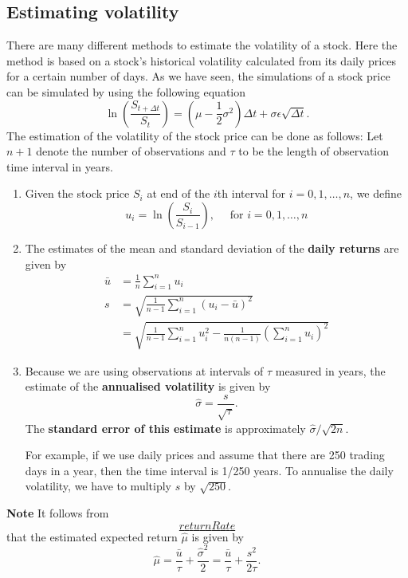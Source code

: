 \documentclass[
]{book}
\theoremstyle{definition}
\theoremstyle{definition}
\theoremstyle{definition}
\theoremstyle{definition}
\theoremstyle{remark}
\begin{document}
\hypertarget{estimating-volatility}{%
\subsection{Estimating volatility}\label{estimating-volatility}}

There are many different methods to estimate the volatility of a stock.
Here the method is based on a stock's historical volatility calculated
from its daily prices for a certain number of days. As we have seen, the
simulations of a stock price can be simulated by using the following
equation
\[\ln\left(  \frac{S_{t+\Delta t}}{S_t} \right) = (\mu - \frac{1}{2}\sigma^2 )\Delta t + \sigma \epsilon \sqrt{\Delta t}.\]
The estimation of the volatility of the stock price can be done as
follows: Let \(n+1\) denote the number of observations and \(\tau\) to be
the length of observation time interval in years.

\begin{enumerate}
\def\labelenumi{\arabic{enumi}.}
\item
  Given the stock price \(S_i\) at end of the \(i\)th interval for
  \(i = 0,1, \ldots, n\), we define
  \[u_i = \ln \left(\frac{S_i}{S_{i-1}} \right), \quad \text{ for } i = 0,1, \ldots, n\]
\item
  The estimates of the mean and standard deviation of the \textbf{daily
  returns} are given by \[\begin{aligned}
      \bar{u} &= \frac{1}{n} \sum_{i=1}^n u_i \\
      s &= \sqrt{\frac{1}{n-1} \sum_{i=1}^n (u_i - \bar{u})^2 } \\
          &= \sqrt{\frac{1}{n-1} \sum_{i=1}^n    u_i^2 - \frac{1}{n(n-1)}  \left(\sum_{i=1}^n u_i  \right)^2 }\end{aligned}\]
\item
  Because we are using observations at intervals of \(\tau\) measured in
  years, the estimate of the \textbf{annualised volatility} is given by
  \[\hat{\sigma} = \frac{s}{\sqrt{\tau}}.\] The \textbf{standard error of
  this estimate} is approximately \(\hat{\sigma}/\sqrt{2n}\).

  For example, if we use daily prices and assume that there are 250
  trading days in a year, then the time interval is 1/250 years. To
  annualise the daily volatility, we have to multiply \(s\) by
  \(\sqrt{250}\).
\end{enumerate}

\textbf{Note} It follows from
\protect\hyperlink{returnRate}{\[returnRate\]} that the estimated expected return \(\hat{\mu}\)
is given by
\[\hat{\mu}  =  \frac{\bar{u}}{\tau}  + \frac{\hat{\sigma}^2}{2} = \frac{\bar{u}}{\tau}  + \frac{s^2}{2\tau} .\]
\end{document}
